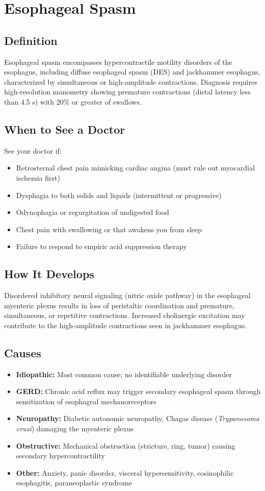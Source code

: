 \chapter{Esophageal Spasm}

\section*{Definition}
Esophageal spasm encompasses hypercontractile motility disorders of the esophagus, including diffuse esophageal spasm (DES) and jackhammer esophagus, characterized by simultaneous or high-amplitude contractions. Diagnosis requires high-resolution manometry showing premature contractions (distal latency less than 4.5 s) with 20\% or greater of swallows.

\section*{When to See a Doctor}
See your doctor if:
\begin{itemize}
  \item Retrosternal chest pain mimicking cardiac angina (must rule out myocardial ischemia first)
  \item Dysphagia to both solids and liquids (intermittent or progressive)
  \item Odynophagia or regurgitation of undigested food
  \item Chest pain with swallowing or that awakens you from sleep
  \item Failure to respond to empiric acid suppression therapy
\end{itemize}

\section*{How It Develops}
Disordered inhibitory neural signaling (nitric oxide pathway) in the esophageal myenteric plexus results in loss of peristaltic coordination and premature, simultaneous, or repetitive contractions. Increased cholinergic excitation may contribute to the high-amplitude contractions seen in jackhammer esophagus.

\section*{Causes}
\begin{itemize}
  \item \textbf{Idiopathic:} Most common cause; no identifiable underlying disorder
  \item \textbf{GERD:} Chronic acid reflux may trigger secondary esophageal spasm through sensitization of esophageal mechanoreceptors
  \item \textbf{Neuropathy:} Diabetic autonomic neuropathy, Chagas disease (\textit{Trypanosoma cruzi}) damaging the myenteric plexus
  \item \textbf{Obstructive:} Mechanical obstruction (stricture, ring, tumor) causing secondary hypercontractility
  \item \textbf{Other:} Anxiety, panic disorder, visceral hypersensitivity, eosinophilic esophagitis, paraneoplastic syndrome
\end{itemize}

